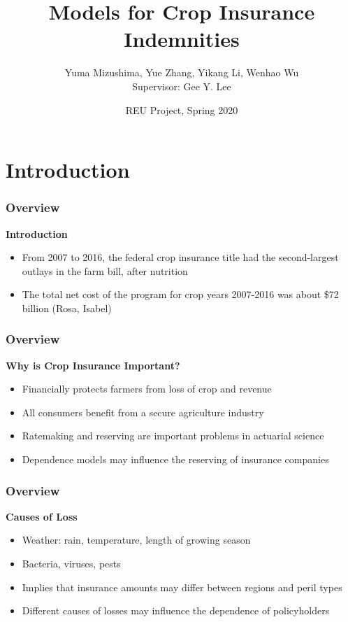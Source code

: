 \documentclass[serif,10pt,aspectratio=169]{beamer}
\begin{document}
\title{Models for Crop Insurance Indemnities}
\author[]{ Yuma Mizushima, Yue Zhang, Yikang Li, Wenhao Wu \\ \bigskip Supervisor: Gee Y. Lee }
\date[]{REU Project, Spring 2020}

\frame{\titlepage}


\section{Introduction}


\begin{frame}
\frametitle{Overview}
\textbf{Introduction}
\begin{itemize}
\item From 2007 to 2016, the federal crop insurance title had the second-largest outlays in the farm bill, after nutrition
\item The total net cost of the program for crop years 2007-2016 was about \$72 billion  (Rosa, Isabel)
\end{itemize}
\end{frame}

\begin{frame}
\frametitle{Overview}
\textbf{Why is Crop Insurance Important?}
\begin{itemize}
\item Financially protects farmers from loss of crop and revenue
\item All consumers benefit from a secure agriculture industry
\item Ratemaking and reserving are important problems in actuarial science
\item Dependence models may influence the reserving of insurance companies
\end{itemize}
\end{frame}


\begin{frame}
\frametitle{Overview}
\textbf{Causes of Loss}
\begin{itemize}
\item Weather: rain, temperature, length of growing season
\item  Bacteria, viruses, pests
\item Implies that insurance amounts may differ between regions and peril types
\item Different causes of losses may influence the dependence of policyholders
\end{itemize}
\end{frame}
\end{document}

